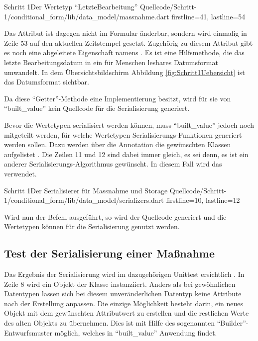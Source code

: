 \begin{alexlisting}{Schritt 1}{Der Wertetyp \enquote{LetzteBearbeitung}}
  {Quellcode/Schritt-1/conditional_form/lib/data_model/massnahme.dart}
  {firstline=41, lastline=54}
  \label{lst:Schritt1WerteTypLetzteBearbeitung}
\end{alexlisting}

Das Attribut  ist dagegen nicht im Formular änderbar, sondern wird einmalig in Zeile 53 auf den aktuellen Zeitstempel gesetzt.
Zugehörig zu diesem Attribut gibt es noch eine abgeleitete Eigenschaft namens  .
Es ist eine Hilfsmethode, die das letzte Bearbeitungsdatum in ein für Menschen lesbares Datumsformat umwandelt. In dem Übersichtsbildschirm Abbildung \ref{fig:Schritt1Uebersicht} ist das Datumsformat sichtbar.

Da diese \enquote{Getter}-Methode eine Implementierung besitzt, wird für sie von \enquote{built_value} kein Quellcode für die Serialisierung generiert.

Bevor die Wertetypen serialisiert werden können, muss \enquote{built_value} jedoch noch mitgeteilt werden, für welche Wertetypen Serialisierungs-Funktionen generiert werden sollen.
Dazu werden über die Annotation  die gewünschten Klassen aufgelistet .
Die Zeilen 11 und 12 sind dabei immer gleich, es sei denn, es ist ein anderer Serialisierungs-Algorithmus gewünscht.
In diesem Fall wird das verwendet.

\begin{alexlisting}{Schritt 1}{Der Serialisierer für Massnahme und Storage}
  {Quellcode/Schritt-1/conditional_form/lib/data_model/serializers.dart}
  {firstline=10, lastline=12}
  \label{lst:Schritt1Serialisierer}
\end{alexlisting}

Wird nun der Befehl   ausgeführt, so wird der Quellcode generiert und die Wertetypen können für die Serialisierung genutzt werden.

\subsection{Test der Serialisierung einer Maßnahme}

Das Ergebnis der Serialisierung wird im dazugehörigen Unittest ersichtlich \Lst{\ref{lst:SerialisierungEinerMassnahmeUnittest}}.
In Zeile 8 wird ein Objekt der Klasse  instanziiert.
Anders als bei gewöhnlichen Datentypen lassen sich bei diesem unveränderlichen Datentyp keine Attribute nach der Erstellung anpassen.
Die einzige Möglichkeit besteht darin, ein neues Objekt  mit dem gewünschten Attributwert zu erstellen und die restlichen Werte des alten Objekts zu übernehmen.
Dies ist mit Hilfe des sogenannten \enquote{Builder}-Entwurfsmuster möglich, welches in \enquote{built_value} Anwendung findet.

